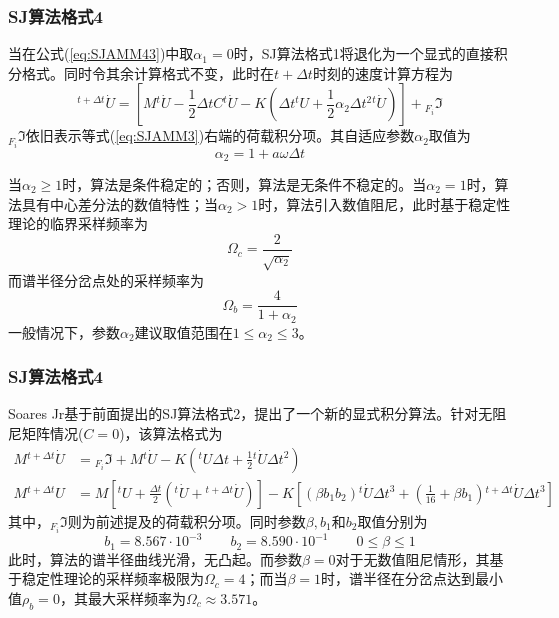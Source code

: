 \subsubsection{SJ算法格式4\cite{Soares2014}}
当在公式(\ref{eq:SJAMM43})中取$\alpha_1=0$时，SJ算法格式1\cite{SoaresJr2016}将退化为一个显式的直接积分格式\cite{Soares2014}。同时令其余计算格式不变，此时在$t+\Delta t$时刻的速度计算方程为
\begin{equation}
[M+\frac{1}{2}\Delta tC]{^{t+\Delta t}\!\dot{U}}=[M{^t\!\dot{U}}-\frac{1}{2}\Delta tC{^t\!\dot{U}}-K(\Delta t{^t\!U}+\frac{1}{2}\alpha_2\Delta t^2{^t\!\dot{U}})]+{_{F_i}\!\Im}
\end{equation}
${_{F_i}\!\Im}$依旧表示等式(\ref{eq:SJAMM3})右端的荷载积分项。其自适应参数$\alpha_2$取值为
\begin{equation}
\alpha_2=1+a\omega\Delta t
\end{equation}

当$\alpha_2\ge1$时，算法是条件稳定的；否则，算法是无条件不稳定的。当$\alpha_2=1$时，算法具有中心差分法的数值特性；当$\alpha_2>1$时，算法引入数值阻尼，此时基于稳定性理论的临界采样频率为
\begin{equation}
\Omega_c=\frac{2}{\sqrt{\alpha_2}}
\end{equation}
而谱半径分岔点处的采样频率为
\begin{equation}
\Omega_b=\frac{4}{1+\alpha_2}
\end{equation}
一般情况下，参数$\alpha_2$建议取值范围在$1\le\alpha_2\le3$。

\subsubsection{SJ算法格式4\cite{SoaresJr2016a}}
Soares Jr基于前面提出的SJ算法格式2\cite{Jr2014}，提出了一个新的显式积分算法\cite{SoaresJr2016a}。针对无阻尼矩阵情况($C=0$)，该算法格式为
\begin{align}
 M{^{t+\Delta t}\!\dot{U}}&={_{F_i}\!\Im}+M{^t\!\dot{U}}-K({^t\!U}\Delta t+\frac12{^t\!\dot{U}}\Delta t^2)\\
 M{^{t+\Delta t}\!U}&=M[{^t\!U}+\frac{\Delta t}{2}({^t\!\dot{U}}+{^{t+\Delta t}\!\dot{U}})]-K[(\beta b_1b_2){^t\!\dot{U}}\Delta t^3+(\frac{1}{16}+\beta b_1){^{t+\Delta t}\!\dot{U}}\Delta t^3]
\end{align}
其中，${_{F_i}\!\Im}$则为前述提及的荷载积分项。同时参数$\beta,b_1$和$b_2$取值分别为
\begin{equation}
b_1=8.567\cdot10^{-3}\qquad b_2=8.590\cdot10^{-1}\qquad 0\le\beta\le1
\end{equation}
此时，算法的谱半径曲线光滑，无凸起。而参数$\beta=0$对于无数值阻尼情形，其基于稳定性理论的采样频率极限为$\Omega_c=4$；而当$\beta=1$时，谱半径在分岔点达到最小值$\rho_b=0$，其最大采样频率为$\Omega_c\approx3.571$。

